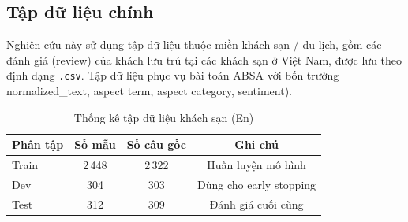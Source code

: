 \subsection{Tập dữ liệu chính}

Nghiên cứu này sử dụng tập dữ liệu thuộc miền khách sạn / du lịch,
gồm các đánh giá (review) của khách lưu trú tại các khách sạn ở Việt
Nam, được lưu theo định dạng \texttt{.csv}. Tập dữ liệu phục vụ bài
toán ABSA với bốn trường normalized\_text, aspect term,
aspect category, sentiment).

\begin{table}[H]
\centering
\caption{Thống kê tập dữ liệu khách sạn (En)}
\label{tab:dataset_hotel}
\begin{tabular}{@{}lccc@{}}
\toprule
\textbf{Phân tập} & \textbf{Số mẫu} & \textbf{Số câu gốc} & \textbf{Ghi chú} \\
\midrule
Train & 2\,448 & 2\,322 & Huấn luyện mô hình \\
Dev   &   304 &   303 & Dùng cho early stopping \\
Test  &   312 &   309 & Đánh giá cuối cùng \\
\bottomrule
\end{tabular}
\end{table}

